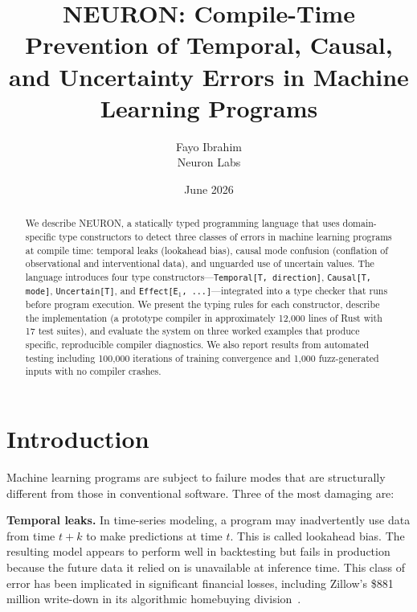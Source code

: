 \documentclass[11pt,a4paper]{article}
\title{\textbf{NEURON: Compile-Time Prevention of Temporal, Causal,\\and Uncertainty Errors in Machine Learning Programs}}
\author{Fayo Ibrahim \\ \small{Neuron Labs}}
\date{June 2026}
\newcommand{\ty}[1]{\texttt{#1}}
\begin{document}
\maketitle


\begin{abstract}
We describe NEURON, a statically typed programming language that uses domain-specific type constructors to detect three classes of errors in machine learning programs at compile time: temporal leaks (lookahead bias), causal mode confusion (conflation of observational and interventional data), and unguarded use of uncertain values. The language introduces four type constructors---\ty{Temporal[T, direction]}, \ty{Causal[T, mode]}, \ty{Uncertain[T]}, and \ty{Effect[E$_1$, ...]}---integrated into a type checker that runs before program execution. We present the typing rules for each constructor, describe the implementation (a prototype compiler in approximately 12,000 lines of Rust with 17 test suites), and evaluate the system on three worked examples that produce specific, reproducible compiler diagnostics. We also report results from automated testing including 100,000 iterations of training convergence and 1,000 fuzz-generated inputs with no compiler crashes.
\end{abstract}


\section{Introduction}

Machine learning programs are subject to failure modes that are structurally different from those in conventional software. Three of the most damaging are:

\textbf{Temporal leaks.} In time-series modeling, a program may inadvertently use data from time $t+k$ to make predictions at time $t$. This is called lookahead bias. The resulting model appears to perform well in backtesting but fails in production because the future data it relied on is unavailable at inference time. This class of error has been implicated in significant financial losses, including Zillow's \$881 million write-down in its algorithmic homebuying division~\cite{zillow2021}.
\end{document}
